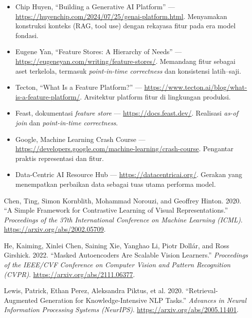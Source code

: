 \begin{bacaan}

\begin{itemize}
\tightlist
\item
  Chip Huyen, ``Building a Generative AI Platform'' --- \url{https://huyenchip.com/2024/07/25/genai-platform.html}. Menyamakan konstruksi konteks (RAG, tool use) dengan rekayasa fitur pada era model fondasi.
\item
  Eugene Yan, ``Feature Stores: A Hierarchy of Needs'' --- \url{https://eugeneyan.com/writing/feature-stores/}. Memandang fitur sebagai aset terkelola, termasuk \emph{point-in-time correctness} dan konsistensi latih--saji.
\item
  Tecton, ``What Is a Feature Platform?'' --- \url{https://www.tecton.ai/blog/what-is-a-feature-platform/}. Arsitektur platform fitur di lingkungan produksi.
\item
  Feast, dokumentasi \emph{feature store} --- \url{https://docs.feast.dev/}. Realisasi \emph{as-of join} dan \emph{point-in-time correctness}.
\item
  Google, Machine Learning Crash Course --- \url{https://developers.google.com/machine-learning/crash-course}. Pengantar praktis representasi dan fitur.
\item
  Data-Centric AI Resource Hub --- \url{https://datacentricai.org/}. Gerakan yang menempatkan perbaikan data sebagai tuas utama performa model.
\end{itemize}

\end{bacaan}

\rujukanheading

\protect{}\label{refs}
\begin{CSLReferences}{1}{1}
Chen, Ting, Simon Kornblith, Mohammad Norouzi, and Geoffrey Hinton. 2020. {``A Simple Framework for Contrastive Learning of Visual Representations.''} \emph{Proceedings of the 37th International Conference on Machine Learning (ICML)}. \url{https://arxiv.org/abs/2002.05709}.

He, Kaiming, Xinlei Chen, Saining Xie, Yanghao Li, Piotr Dollár, and Ross Girshick. 2022. {``Masked Autoencoders Are Scalable Vision Learners.''} \emph{Proceedings of the IEEE/CVF Conference on Computer Vision and Pattern Recognition (CVPR)}. \url{https://arxiv.org/abs/2111.06377}.

Lewis, Patrick, Ethan Perez, Aleksandra Piktus, et al. 2020. {``Retrieval-Augmented Generation for Knowledge-Intensive {NLP} Tasks.''} \emph{Advances in Neural Information Processing Systems (NeurIPS)}. \url{https://arxiv.org/abs/2005.11401}.

\end{CSLReferences}
